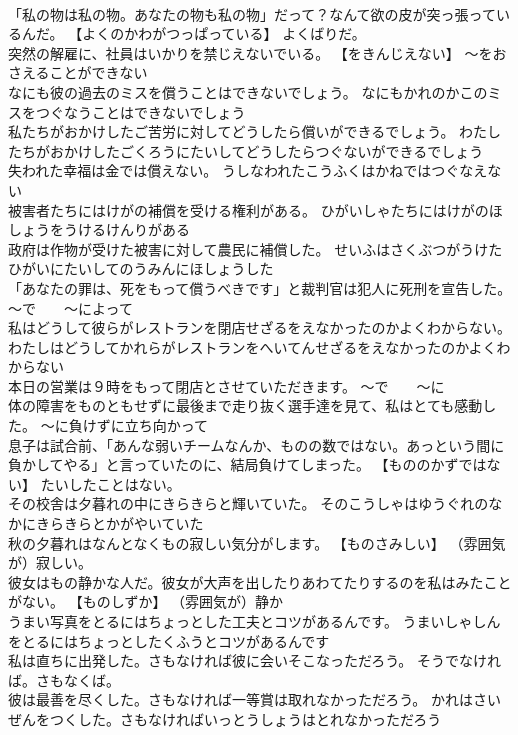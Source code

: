\documentclass[8pt]{extreport}
\begin{document}
\begin{CJK}{UTF8}{min}
\\	「私の物は私の物。あなたの物も私の物」だって？なんて欲の皮が突っ張っているんだ。	【よくのかわがつっぱっている】 よくばりだ。
\\	突然の解雇に、社員はいかりを禁じえないでいる。	【をきんじえない】 ～をおさえることができない
\\	なにも彼の過去のミスを償うことはできないでしょう。	なにもかれのかこのミスをつぐなうことはできないでしょう 
\\	私たちがおかけしたご苦労に対してどうしたら償いができるでしょう。	わたしたちがおかけしたごくろうにたいしてどうしたらつぐないができるでしょう 
\\	失われた幸福は金では償えない。	うしなわれたこうふくはかねではつぐなえない 
\\	被害者たちにはけがの補償を受ける権利がある。	ひがいしゃたちにはけがのほしょうをうけるけんりがある 
\\	政府は作物が受けた被害に対して農民に補償した。	せいふはさくぶつがうけたひがいにたいしてのうみんにほしょうした 
\\	「あなたの罪は、死をもって償うべきです」と裁判官は犯人に死刑を宣告した。	～で　　～によって
\\	私はどうして彼らがレストランを閉店せざるをえなかったのかよくわからない。	わたしはどうしてかれらがレストランをへいてんせざるをえなかったのかよくわからない 
\\	本日の営業は９時をもって閉店とさせていただきます。	～で　　～に
\\	体の障害をものともせずに最後まで走り抜く選手達を見て、私はとても感動した。	～に負けずに立ち向かって
\\	息子は試合前、「あんな弱いチームなんか、ものの数ではない。あっという間に負かしてやる」と言っていたのに、結局負けてしまった。	【もののかずではない】 たいしたことはない。
\\	その校舎は夕暮れの中にきらきらと輝いていた。	そのこうしゃはゆうぐれのなかにきらきらとかがやいていた 
\\	秋の夕暮れはなんとなくもの寂しい気分がします。	【ものさみしい】 （雰囲気が）寂しい。
\\	彼女はもの静かな人だ。彼女が大声を出したりあわてたりするのを私はみたことがない。	【ものしずか】 （雰囲気が）静か
\\	うまい写真をとるにはちょっとした工夫とコツがあるんです。	うまいしゃしんをとるにはちょっとしたくふうとコツがあるんです 
\\	私は直ちに出発した。さもなければ彼に会いそこなっただろう。	そうでなければ。さもなくば。
\\	彼は最善を尽くした。さもなければ一等賞は取れなかっただろう。	かれはさいぜんをつくした。さもなければいっとうしょうはとれなかっただろう 

\end{CJK}
\end{document}
